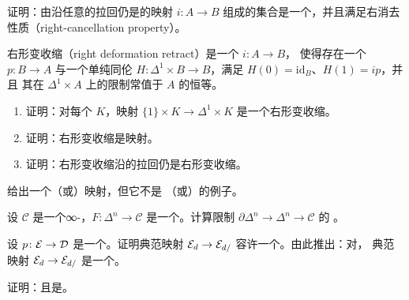 \begin{exercise}\label{ex:right-anodyne-pullback-saturated}
证明：由沿任意\trLeftFibration{}的拉回仍是\trRightAnodyne{}的\trRightAnodyne{}映射
$i\colon A \to B$ 组成的集合是一个\trSaturatedSet，并且满足右消去性质（right-cancellation property）。
\end{exercise}

\begin{exercise}\label{ex:right-deformation-retract}
右形变收缩（right deformation retract）是一个\trMonomorphism{} $i\colon A \to B$，
使得存在一个\trRetraction{} $p\colon B \to A$ 与一个单纯同伦
$H\colon \Delta^1 \times B \to B$，满足 $H(0) = \mathrm{id}_B$、$H(1) = ip$，并且
其在 $\Delta^1 \times A$ 上的限制常值于 $A$ 的恒等。
\begin{enumerate}[label=(\arabic*)]
  \item 证明：对每个\trSimplicialSet{} $K$，映射 $\{1\} \times K \to \Delta^1 \times K$
        是一个右形变收缩。
  \item 证明：右形变收缩是\trRightAnodyne{}映射。
  \item 证明：右形变收缩沿\trLeftFibration{}的拉回仍是右形变收缩。
\end{enumerate}
\end{exercise}

\begin{exercise}\label{ex:proper-not-universally-proper}
给出一个\trProper{}（或\trSmooth{}）映射，但它不是\trUniversallyProper{}%
（或\trUniversallySmooth{}）的例子。
\end{exercise}

\begin{exercise}\label{ex:colimit-boundary-restriction}
设 $\mathcal{C}$ 是一个\trCocomplete{}∞-\trCategory{}，$F\colon \Delta^n \to \mathcal{C}$
是一个\trFunctor{}。计算限制 $\partial\Delta^n \to \Delta^n \to \mathcal{C}$ 的%
\trColimit{}。
\end{exercise}

\begin{exercise}\label{ex:cartesian-fibre-right-adjoint}
设 $p\colon \mathcal{E} \to \mathcal{D}$ 是一个\trCartesianFibration{}。证明典范映射
$\mathcal{E}_d \to \mathcal{E}_{d/}$ 容许一个\trRightAdjoint{}。由此推出：对\trCartesianFibration{}，
典范映射 $\mathcal{E}_d \to \mathcal{E}_{d/}$ 是一个\trWeakEquivalence{}。
\end{exercise}

\begin{exercise}\label{ex:fully-faithful-invertible}
证明：\trFullyFaithful{}且\trEssentiallySurjective{}\trFunctor{}是\trInvertible{}。
\end{exercise}

